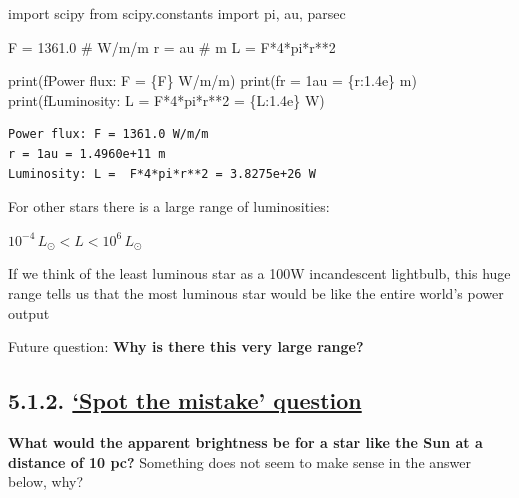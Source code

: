 \documentclass[
  letterpaper,
  DIV=11,
  numbers=noendperiod]{scrreprt}
\newenvironment{Shaded}{\begin{snugshade}}{\end{snugshade}}
\newcommand{\BuiltInTok}[1]{\textcolor[rgb]{0.00,0.23,0.31}{#1}}
\newcommand{\CommentTok}[1]{\textcolor[rgb]{0.37,0.37,0.37}{#1}}
\newcommand{\DecValTok}[1]{\textcolor[rgb]{0.68,0.00,0.00}{#1}}
\newcommand{\FloatTok}[1]{\textcolor[rgb]{0.68,0.00,0.00}{#1}}
\newcommand{\ImportTok}[1]{\textcolor[rgb]{0.00,0.46,0.62}{#1}}
\newcommand{\NormalTok}[1]{\textcolor[rgb]{0.00,0.23,0.31}{#1}}
\newcommand{\OperatorTok}[1]{\textcolor[rgb]{0.37,0.37,0.37}{#1}}
\newcommand{\SpecialCharTok}[1]{\textcolor[rgb]{0.37,0.37,0.37}{#1}}
\newcommand{\SpecialStringTok}[1]{\textcolor[rgb]{0.13,0.47,0.30}{#1}}
\begin{document}
\begin{Shaded}
\begin{Highlighting}[]
\ImportTok{import}\NormalTok{ scipy}
\ImportTok{from}\NormalTok{ scipy.constants }\ImportTok{import}\NormalTok{ pi, au, parsec}

\NormalTok{F }\OperatorTok{=} \FloatTok{1361.0} \CommentTok{\# W/m/m}
\NormalTok{r }\OperatorTok{=}\NormalTok{ au }\CommentTok{\# m}
\NormalTok{L }\OperatorTok{=}\NormalTok{ F}\OperatorTok{*}\DecValTok{4}\OperatorTok{*}\NormalTok{pi}\OperatorTok{*}\NormalTok{r}\OperatorTok{**}\DecValTok{2}

\BuiltInTok{print}\NormalTok{(}\SpecialStringTok{f\textquotesingle{}Power flux: F = }\SpecialCharTok{\{}\NormalTok{F}\SpecialCharTok{\}}\SpecialStringTok{ W/m/m\textquotesingle{}}\NormalTok{)}
\BuiltInTok{print}\NormalTok{(}\SpecialStringTok{f\textquotesingle{}r = 1au = }\SpecialCharTok{\{}\NormalTok{r}\SpecialCharTok{:1.4e\}}\SpecialStringTok{ m\textquotesingle{}}\NormalTok{)}
\BuiltInTok{print}\NormalTok{(}\SpecialStringTok{f\textquotesingle{}Luminosity: L =  F*4*pi*r**2 = }\SpecialCharTok{\{}\NormalTok{L}\SpecialCharTok{:1.4e\}}\SpecialStringTok{ W\textquotesingle{}}\NormalTok{)}
\end{Highlighting}
\end{Shaded}

\begin{verbatim}
Power flux: F = 1361.0 W/m/m
r = 1au = 1.4960e+11 m
Luminosity: L =  F*4*pi*r**2 = 3.8275e+26 W
\end{verbatim}

For other stars there is a large range of luminosities:

\(10^{-4}\,L_\odot < L < 10^{6}\,L_\odot\)

If we think of the least luminous star as a 100W incandescent lightbulb,
this huge range tells us that the most luminous star would be like the
entire world's power output

Future question: \textbf{Why is there this very large range?}

\hypertarget{spot-the-mistake-question-1}{%
\subsection{\texorpdfstring{5.1.2. \protect\hyperlink{toc0_}{`Spot the
mistake'
question}}{5.1.2. `Spot the mistake' question}}\label{spot-the-mistake-question-1}}

\textbf{What would the apparent brightness be for a star like the Sun at
a distance of 10 pc?} Something does not seem to make sense in the
answer below, why?
\end{document}
